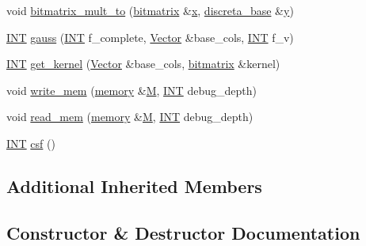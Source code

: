 \begin{DoxyCompactItemize}
\item 
void \mbox{\hyperlink{classbitmatrix_afb73fc8dc14653159b63b969c5ca4856}{bitmatrix\+\_\+mult\+\_\+to}} (\mbox{\hyperlink{classbitmatrix}{bitmatrix}} \&\mbox{\hyperlink{alphabet2_8_c_a6150e0515f7202e2fb518f7206ed97dc}{x}}, \mbox{\hyperlink{classdiscreta__base}{discreta\+\_\+base}} \&\mbox{\hyperlink{alphabet2_8_c_a0a2f84ed7838f07779ae24c5a9086d33}{y}})
\item 
\mbox{\hyperlink{galois_8h_a09fddde158a3a20bd2dcadb609de11dc}{I\+NT}} \mbox{\hyperlink{classbitmatrix_ad43da9e457904e1dfa459b78147e0667}{gauss}} (\mbox{\hyperlink{galois_8h_a09fddde158a3a20bd2dcadb609de11dc}{I\+NT}} f\+\_\+complete, \mbox{\hyperlink{class_vector}{Vector}} \&base\+\_\+cols, \mbox{\hyperlink{galois_8h_a09fddde158a3a20bd2dcadb609de11dc}{I\+NT}} f\+\_\+v)
\item 
\mbox{\hyperlink{galois_8h_a09fddde158a3a20bd2dcadb609de11dc}{I\+NT}} \mbox{\hyperlink{classbitmatrix_a665129645bad35018674f8b5a694a13e}{get\+\_\+kernel}} (\mbox{\hyperlink{class_vector}{Vector}} \&base\+\_\+cols, \mbox{\hyperlink{classbitmatrix}{bitmatrix}} \&kernel)
\item 
void \mbox{\hyperlink{classbitmatrix_a8dd74a0158ac5fbf4c2c6b7a71f9a39f}{write\+\_\+mem}} (\mbox{\hyperlink{classmemory}{memory}} \&\mbox{\hyperlink{plane__search_8_c_ad2d23ebd03187a91edd45b1d5e496265}{M}}, \mbox{\hyperlink{galois_8h_a09fddde158a3a20bd2dcadb609de11dc}{I\+NT}} debug\+\_\+depth)
\item 
void \mbox{\hyperlink{classbitmatrix_aa126a5db3bfaebc3ad193fc01bbfac9b}{read\+\_\+mem}} (\mbox{\hyperlink{classmemory}{memory}} \&\mbox{\hyperlink{plane__search_8_c_ad2d23ebd03187a91edd45b1d5e496265}{M}}, \mbox{\hyperlink{galois_8h_a09fddde158a3a20bd2dcadb609de11dc}{I\+NT}} debug\+\_\+depth)
\item 
\mbox{\hyperlink{galois_8h_a09fddde158a3a20bd2dcadb609de11dc}{I\+NT}} \mbox{\hyperlink{classbitmatrix_a2d11a854ea302b0e6fa61c9c6607deaf}{csf}} ()
\end{DoxyCompactItemize}
\subsection*{Additional Inherited Members}


\subsection{Constructor \& Destructor Documentation}
\mbox{\label{classbitmatrix_af6715cab25d568c8ad82c0dee2e9791d}} 

